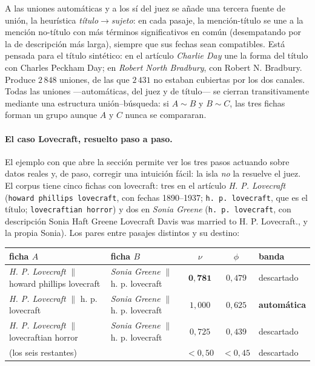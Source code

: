 \documentclass[11pt,a4paper]{article}
\begin{document}
A las uniones automáticas y a los \guillemotleft{}sí\guillemotright{} del juez se añade una tercera fuente
de unión, la heurística \emph{título$\to$sujeto}: en cada pasaje, la
mención-título se une a la mención no-título con más términos
significativos en común (desempatando por la de descripción más larga),
siempre que sus fechas sean compatibles. Está pensada para el título
sintético: en el artículo \emph{Charlie Day} une la forma del título con
\guillemotleft{}Charles Peckham Day\guillemotright{}; en \emph{Robert North Bradbury}, con \guillemotleft{}Robert N.
Bradbury\guillemotright{}. Produce $2\,848$ uniones, de las que $2\,431$ no estaban
cubiertas por los dos canales. Todas las uniones ---automáticas, del juez y
de título--- se cierran transitivamente mediante una estructura
unión--búsqueda: si $A \sim B$ y $B \sim C$, las tres fichas forman un
grupo aunque $A$ y $C$ nunca se compararan.

\paragraph{El caso Lovecraft, resuelto paso a paso.}
El ejemplo con que abre la sección permite ver los tres pasos actuando
sobre datos reales y, de paso, corregir una intuición fácil: la isla
\emph{no} la resuelve el juez. El corpus tiene cinco fichas con
\guillemotleft{}lovecraft\guillemotright{}: tres en el artículo \emph{H. P. Lovecraft}
(\texttt{howard phillips lovecraft}, con fechas 1890--1937; \texttt{h. p.
lovecraft}, que es el título; \texttt{lovecraftian horror}) y dos en
\emph{Sonia Greene} (\texttt{h. p. lovecraft}, con descripción \guillemotleft{}Sonia Haft
Greene Lovecraft Davis was married to H. P. Lovecraft.\guillemotright{}, y la propia Sonia).
Los pares entre pasajes distintos y su destino:

\begin{center}\footnotesize
\begin{tabular}{llccl}
\toprule
ficha $A$ & ficha $B$ & $\nu$ & $\phi$ & banda\\
\midrule
\emph{H. P. Lovecraft} $\|$ howard phillips lovecraft & \emph{Sonia Greene} $\|$ h. p. lovecraft & $\mathbf{0{,}781}$ & $0{,}479$ & descartado\\
\emph{H. P. Lovecraft} $\|$ h. p. lovecraft & \emph{Sonia Greene} $\|$ h. p. lovecraft & $1{,}000$ & $0{,}625$ & \textbf{automática}\\
\emph{H. P. Lovecraft} $\|$ lovecraftian horror & \emph{Sonia Greene} $\|$ h. p. lovecraft & $0{,}725$ & $0{,}439$ & descartado\\
(los seis restantes) & & $<0{,}50$ & $<0{,}45$ & descartado\\
\bottomrule
\end{tabular}
\end{center}
\end{document}
